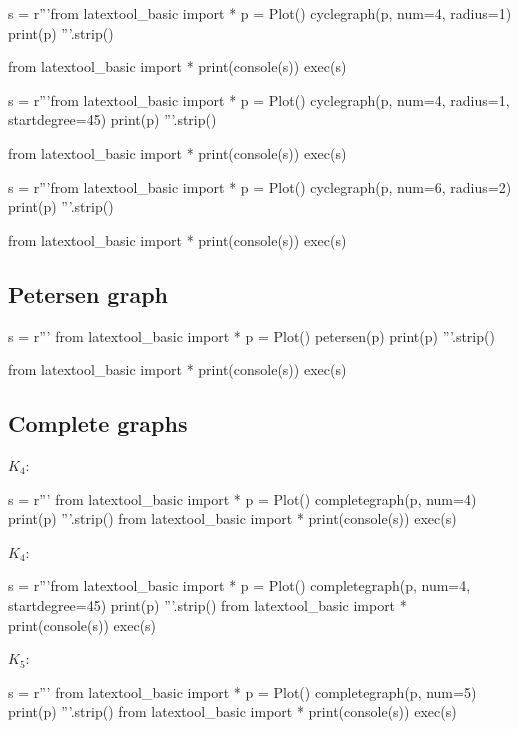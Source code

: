 \begin{python}
s = r'''from latextool_basic import *
p = Plot()
cyclegraph(p, num=4, radius=1)
print(p)
'''.strip()

from latextool_basic import *
print(console(s))
exec(s)
\end{python}
  
\begin{python}
s = r'''from latextool_basic import *
p = Plot()
cyclegraph(p, num=4, radius=1, startdegree=45)
print(p)
'''.strip()

from latextool_basic import *
print(console(s))
exec(s)
\end{python}
  

\begin{python}
s = r'''from latextool_basic import *
p = Plot()
cyclegraph(p, num=6, radius=2)
print(p)
'''.strip()

from latextool_basic import *
print(console(s))
exec(s)
\end{python}




\newpage
\subsection{Petersen graph}
\begin{python}
s = r'''
from latextool_basic import *
p = Plot()
petersen(p)
print(p)
'''.strip()

from latextool_basic import *
print(console(s))
exec(s)
\end{python}




\newpage
\subsection{Complete graphs}

$K_4$:
\begin{python}
s = r'''
from latextool_basic import *
p = Plot()
completegraph(p, num=4)
print(p)
'''.strip()
from latextool_basic import *
print(console(s))
exec(s)
\end{python}

$K_4$:
\begin{python}
s = r'''from latextool_basic import *
p = Plot()
completegraph(p, num=4, startdegree=45)
print(p)
'''.strip()
from latextool_basic import *
print(console(s))
exec(s)
\end{python}


$K_5$:
\begin{python}
s = r'''
from latextool_basic import *
p = Plot()
completegraph(p, num=5)
print(p)
'''.strip()
from latextool_basic import *
print(console(s))
exec(s)
\end{python}
  
